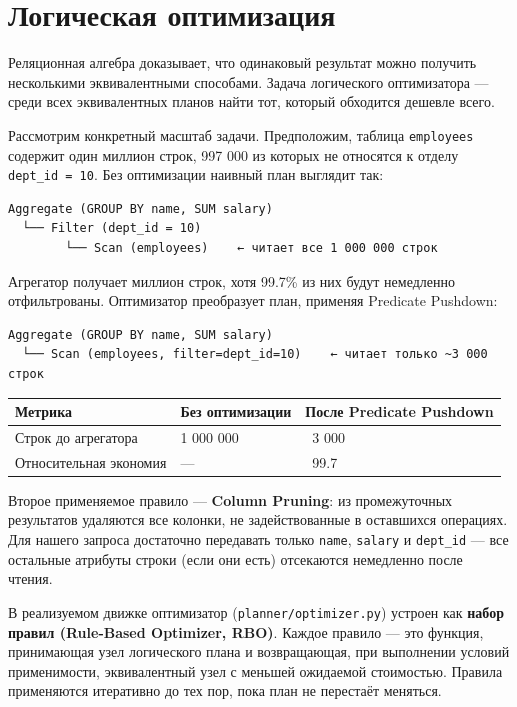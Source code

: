 \documentclass[a4paper,12pt]{report}
\begin{document}
{\section{Логическая оптимизация}

Реляционная алгебра доказывает, что одинаковый результат можно получить несколькими эквивалентными способами. Задача логического оптимизатора — среди всех эквивалентных планов найти тот, который обходится дешевле всего.

Рассмотрим конкретный масштаб задачи. Предположим, таблица \texttt{employees} содержит один миллион строк, 997 000 из которых не относятся к отделу \texttt{dept\_id = 10}. Без оптимизации наивный план выглядит так:

\begin{verbatim}
Aggregate (GROUP BY name, SUM salary)
  └── Filter (dept_id = 10)
        └── Scan (employees)    ← читает все 1 000 000 строк
\end{verbatim}

Агрегатор получает миллион строк, хотя 99.7\% из них будут немедленно отфильтрованы. Оптимизатор преобразует план, применяя Predicate Pushdown:

\begin{verbatim}
Aggregate (GROUP BY name, SUM salary)
  └── Scan (employees, filter=dept_id=10)    ← читает только ~3 000 строк
\end{verbatim}

\begin{longtable}{|l|l|l|}
\hline
Метрика & Без оптимизации & После Predicate Pushdown \\ \hline
Строк до агрегатора & 1 000 000 & ~3 000 \\ \hline
Относительная экономия & — & ~99.7%
\end{longtable}

Второе применяемое правило — \textbf{Column Pruning}: из промежуточных результатов удаляются все колонки, не задействованные в оставшихся операциях. Для нашего запроса достаточно передавать только \texttt{name}, \texttt{salary} и \texttt{dept\_id} — все остальные атрибуты строки (если они есть) отсекаются немедленно после чтения.

В реализуемом движке оптимизатор (\texttt{planner/optimizer.py}) устроен как \textbf{набор правил (Rule-Based Optimizer, RBO)}. Каждое правило — это функция, принимающая узел логического плана и возвращающая, при выполнении условий применимости, эквивалентный узел с меньшей ожидаемой стоимостью. Правила применяются итеративно до тех пор, пока план не перестаёт меняться.

}
\end{document}
